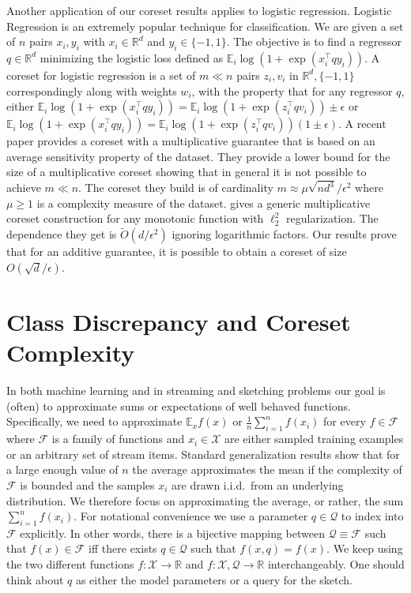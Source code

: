 \documentclass[anon,12pt]{colt2019} %
\newcommand{\R}{\mathbb{R}}
\newcommand{\E}{\mathbb{E}}
\newcommand{\eps}{\epsilon}
\newcommand{\F}{\mathcal{F}}
\newcommand{\X}{\mathcal{X}}
\newcommand{\Q}{\mathcal{Q}}
\begin{document}
Another application of our coreset results applies to logistic regression. Logistic Regression is an extremely popular technique for classification. We are given a set of $n$ pairs $x_i,y_i$ with $x_i \in \R^d$ and $y_i \in \{-1,1\}$. The objective is to find a regressor $q \in \R^d$ minimizing the logistic loss defined as $\E_i \log(1+\exp(x_i^\top q y_i))$. A coreset for logistic regression is a set of $m \ll n$ pairs $z_i, v_i$ in $\R^d, \{-1,1\}$ correspondingly along with weights $w_i$, with the property that for any regressor $q$, either $\E_i \log(1+\exp(x_i^\top q y_i)) = \E_i \log(1+\exp(z_i^\top q v_i)) \pm \eps$ or $\E_i \log(1+\exp(x_i^\top q y_i)) = \E_i \log(1+\exp(z_i^\top q v_i)) (1 \pm \eps)$. A recent paper \cite{DBLP:journals/corr/abs-1805-08571} provides a coreset with a multiplicative guarantee that is based on an average sensitivity property of the dataset. They provide a lower bound for the size of a multiplicative coreset showing that in general it is not possible to achieve $m \ll n$. The coreset they build is of cardinality $m \approx \mu\sqrt{nd^3}/\eps^2$ where $\mu \geq 1$ is a complexity measure of the dataset.  \cite{tolochinsky2018coresets} gives a generic multiplicative coreset construction for any monotonic function with $\ell_2^2$ regularization. The dependence they get is $\tilde O(d/\eps^2)$ ignoring logarithmic factors.  Our results prove that for an additive guarantee, it is possible to obtain a coreset of size $O(\sqrt{d}/\eps)$.


\section{Class Discrepancy and Coreset Complexity}

In both machine learning and in streaming and sketching problems our goal is (often) to approximate sums or expectations of well behaved functions.
Specifically, we need to approximate $\E_x f(x)$ or $\frac{1}{n}\sum_{i=1}^{n} f(x_i)$ for every $f\in \F$ where $\F$ is a family of functions and $x_i \in \X$ are either sampled training examples or an arbitrary set of stream items. 
Standard generalization results show that for a large enough value of $n$ the average approximates the mean if the complexity of $\F$ is bounded and the samples $x_i$ are drawn i.i.d.\ from an underlying distribution. We therefore focus on approximating the average, or rather, the sum $\sum_{i=1}^{n} f(x_i)$. For notational convenience we use a parameter $q \in \Q$ to index into $\F$ explicitly. 
In other words, there is a bijective mapping between $\Q \equiv \F$ such that $f(x) \in \F$ iff there exists $q\in\Q$ such that $f(x,q)=f(x)$.
We keep using the two different functions $f:\X\rightarrow\R$ and $f:\X,\Q\rightarrow\R$ interchangeably. 
One should think about $q$ as either the model parameters or a query for the sketch. 
\end{document}
